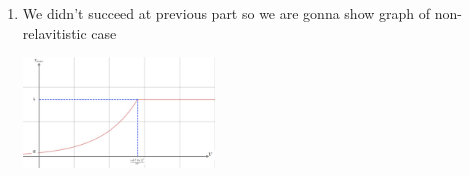 \begin{sol}
\begin{enumerate}[label=\textbf{(\alph*)}]
        \item
        We  didn't succeed at previous part so we are gonna show graph of non-relavitistic case  
        \begin{center}
            \includegraphics[width=0.4\textwidth]{image.jpg}
        \end{center}
    \end{enumerate}
\vspace{15mm}
\end{sol}